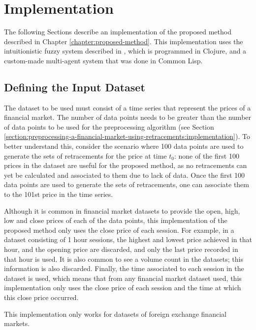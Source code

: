 \chapter{Implementation}
\label{chapter:implementation}

The following Sections describe an implementation of the proposed method
described in Chapter \ref{chapter:proposed-method}. This implementation uses the
intuitionistic fuzzy system described in \cite{Hernandez-Aguila2017}, which is
programmed in Clojure, and a custom-made multi-agent system that was done in
Common Lisp.

\section{Defining the Input Dataset}
\label{section:defining-the-input-dataset}

The dataset to be used must consist of a time series that represent the prices
of a financial market. The number of data points needs to be greater than the
number of data points to be used for the preprocessing algorithm (see Section
\ref{section:preprocessing-a-financial-market-using-retracements:implementation}). To
better understand this, consider the scenario where 100 data points are used to
generate the sets of retracements for the price at time $t_0$: none of the first
100 prices in the dataset are useful for the proposed method, as no retracements
can yet be calculated and associated to them due to lack of data. Once the first
100 data points are used to generate the sets of retracements, one can associate
them to the 101st price in the time series.

Although it is common in financial market datasets to provide the open, high,
low and close prices of each of the data points, this implementation of the
proposed method only uses the close price of each session. For example, in a
dataset consisting of 1 hour sessions, the highest and lowest price achieved in
that hour, and the opening price are discarded, and only the last price recorded
in that hour is used. It is also common to see a volume count in the datasets;
this information is also discarded. Finally, the time associated to each session
in the dataset is used, which means that from any financial market dataset used,
this implementation only uses the close price of each session and the time at
which this close price occurred.

This implementation only works for datasets of foreign exchange financial
markets.


